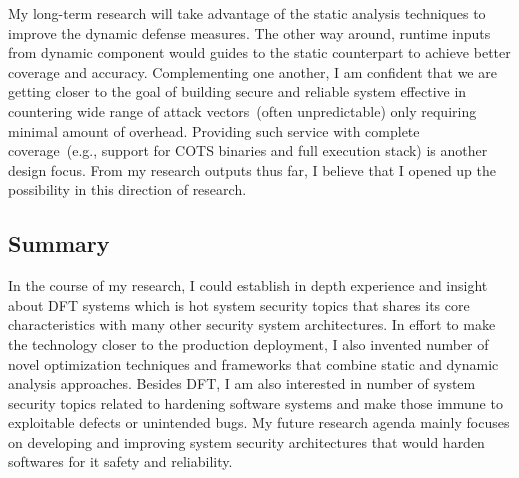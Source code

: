 \documentclass[letterpaper, 10pt]{article}
\begin{document}
\begin{small}
My long-term research will take advantage of  the static analysis techniques to
improve the dynamic defense measures. 
%
The other way around, runtime inputs from dynamic component would guides to the
static counterpart to achieve better coverage and accuracy.
%
Complementing one another, I am confident that we are getting closer to the
goal of building secure and reliable system effective in countering wide range
of attack vectors~(often unpredictable) only requiring minimal amount of
overhead. Providing such service with complete coverage~(e.g., support for COTS
binaries and full execution stack) is another design focus.
%
From my research outputs thus far, I believe that I opened up the possibility
in this direction of research.

\subsection*{Summary}
In the course of my research, I could establish in depth experience and insight
about DFT systems which is hot system security topics that shares its core
characteristics with many other security system architectures.
%
In effort to make the technology closer to the production deployment, I also
invented number of novel optimization techniques and frameworks that combine
static and dynamic analysis approaches.
%
Besides DFT, I am also interested in number of system security topics related
to hardening software systems and make those immune to exploitable defects or
unintended bugs. 
%
My future research agenda mainly focuses on developing and improving system
security architectures that would harden softwares for it safety and
reliability. 
%
\end{small} 

\newpage



\end{document}

